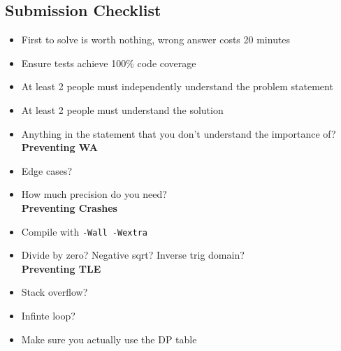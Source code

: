\documentclass[landscape]{article}
\begin{document}
\begin{multicols*}{2}
\subsection{Submission Checklist}
\begin{itemize}
    \setlength\itemsep{-0.5em}
    \item First to solve is worth nothing, wrong answer costs 20 minutes
    \item Ensure tests achieve 100\% code coverage
    \item At least 2 people must independently understand the problem statement
    \item At least 2 people must understand the solution
    \item Anything in the statement that you don't understand the importance of?
    \\\textbf{Preventing WA}
    \item Edge cases?
    \item How much precision do you need?
    \\\textbf{Preventing Crashes}
    \item Compile with \texttt{-Wall -Wextra}
    \item Divide by zero? Negative sqrt? Inverse trig domain?
    \\\textbf{Preventing TLE}
    \item Stack overflow?
    \item Infinte loop?
    \item Make sure you actually use the DP table
\end{itemize}


\end{multicols*}
\end{document}
